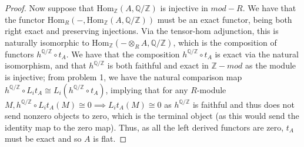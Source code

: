 \documentclass{article}
\newcommand{\Hom}{\text{Hom}}
\newcommand{\bb}[1]{\mathbb{#1}}
\begin{document}
\begin{proof}
\hspace{0.2in} Now suppose that $\Hom_{\bb{Z}}(A, \bb{Q/Z})$ is injective in $mod-R$. We have that the functor $\Hom_{R}(-, \Hom_{\bb{Z}}(A, \bb{Q/Z}))$ must be an exact functor, being both right exact and preserving injections. Via the tensor-hom adjunction, this is naturally isomorphic to $\Hom_{\bb{Z}}(- \otimes_{R} A, \bb{Q/Z})$, which is the composition of functors $h^{\bb{Q/Z}} \circ t_{A}$. We have that the composition $h^{\bb{Q/Z}} \circ t_{A}$ is exact via the natural isomorphism, and that $h^{\bb{Q/Z}}$ is both faithful and exact in $\bb{Z}-mod$ as the module is injective; from problem 1, we have the natural comparison map $h^{\bb{Q/Z}} \circ L_{i}t_{A} \cong L_{i}(h^{\bb{Q/Z}} \circ t_{A})$, implying that for any $R$-module $M, h^{\bb{Q/Z}} \circ L_{i}t_{A}(M) \cong 0 \implies L_{i}t_{A}(M) \cong 0$ as $h^{\bb{Q/Z}}$ is faithful and thus does not send nonzero objects to zero, which is the terminal object (as this would send the identity map to the zero map). Thus, as all the left derived functors are zero, $t_{A}$ must be exact and so $A$ is flat. 
\end{proof}
\end{document}
